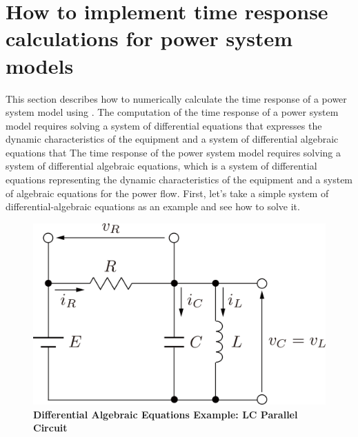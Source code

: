 \documentclass[graybox, envcountchap]{svmult}
\begin{document}
\section{How to implement time response calculations for power system models}\label{sec:timerescal}

This section describes how to numerically calculate the time response of a power system model using \matlab.
The computation of the time response of a power system model requires solving a system of differential equations that expresses the dynamic characteristics of the equipment and a system of differential algebraic equations that The time response of the power system model requires solving a system of differential algebraic equations, which is a system of differential equations representing the dynamic characteristics of the equipment and a system of algebraic equations for the power flow.
First, let's take a simple system of differential-algebraic equations as an example and see how to solve it.

\begin{figure}[t]
  \centering
  \includegraphics[width = .5\linewidth]{figs/circkawaguchi}
  \medskip
  \caption{\textbf{Differential Algebraic Equations Example: LC Parallel Circuit}}
  \label{fig:RLC}
  \medskip
\end{figure}
\end{document}
